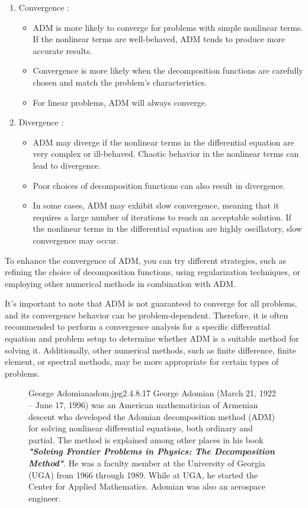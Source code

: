 \documentclass[]{article}
\begin{document}
\begin{enumerate}
    \item Convergence :
          \begin{itemize}
              \item ADM is more likely to converge for problems with simple nonlinear terms. If the nonlinear terms are well-behaved, ADM tends to produce more accurate results.
              \item Convergence is more likely when the decomposition functions are carefully chosen and match the problem's characteristics.
              \item For linear problems, ADM will always converge.
          \end{itemize}
    \item Divergence :
          \begin{itemize}
              \item ADM may diverge if the nonlinear terms in the differential equation are very complex or ill-behaved. Chaotic behavior in the nonlinear terms can lead to divergence.
              \item Poor choices of decomposition functions can also result in divergence.
              \item In some cases, ADM may exhibit slow convergence, meaning that it requires a large number of iterations to reach an acceptable solution. If the nonlinear terms in the differential equation are highly oscillatory, slow convergence may occur.
          \end{itemize}
\end{enumerate}
To enhance the convergence of ADM, you can try different strategies, such as refining the choice of decomposition functions, using regularization techniques, or employing other numerical methods in combination with ADM.
\par
It's important to note that ADM is not guaranteed to converge for all problems, and its convergence behavior can be problem-dependent. Therefore, it is often recommended to perform a convergence analysis for a specific differential equation and problem setup to determine whether ADM is a suitable method for solving it. Additionally, other numerical methods, such as finite difference, finite element, or spectral methods, may be more appropriate for certain types of problems.
\begin{figure}[b]
    \begin{enrichment}{George Adomian}{adom.jpg}{2.4}{.8}{.17}
        George Adomian (March 21, 1922 – June 17, 1996)
        was an American mathematician of Armenian descent
        who developed the Adomian decomposition method (ADM)
        for solving nonlinear differential equations,
        both ordinary and partial.
        The method is explained among other places
        in his book \textit{\textbf{"Solving Frontier Problems in Physics:
                The Decomposition Method"}}.
        He was a faculty member at the University of Georgia
        (UGA) from 1966 through 1989. While at UGA,
        he started the Center for Applied Mathematics.
        Adomian was also an aerospace engineer.
    \end{enrichment}
\end{figure}
\newpage
\end{document}
